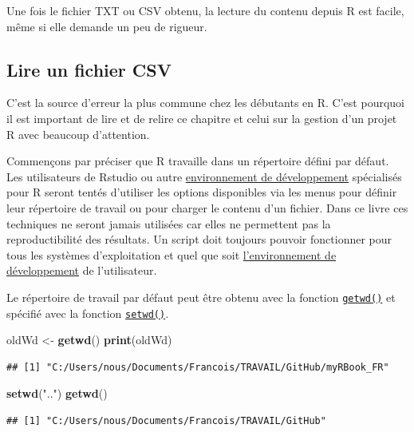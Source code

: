\documentclass[
]{book}
\newenvironment{Shaded}{\begin{snugshade}}{\end{snugshade}}
\newcommand{\KeywordTok}[1]{\textcolor[rgb]{0.13,0.29,0.53}{\textbf{#1}}}
\newcommand{\NormalTok}[1]{#1}
\newcommand{\StringTok}[1]{\textcolor[rgb]{0.31,0.60,0.02}{#1}}
\begin{document}
Une fois le fichier TXT ou CSV obtenu, la lecture du contenu depuis R est facile, même si elle demande un peu de rigueur.

\hypertarget{l016readCSV}{%
\subsection{Lire un fichier CSV}\label{l016readCSV}}

C'est la source d'erreur la plus commune chez les débutants en R. C'est pourquoi il est important de lire et de relire ce chapitre et celui sur la gestion d'un projet R avec beaucoup d'attention.

Commençons par préciser que R travaille dans un répertoire défini par défaut. Les utilisateurs de Rstudio ou autre \protect\hyperlink{IDE}{environnement de développement} spécialisés pour R seront tentés d'utiliser les options disponibles via les menus pour définir leur répertoire de travail ou pour charger le contenu d'un fichier. Dans ce livre ces techniques ne seront jamais utilisées car elles ne permettent pas la reproductibilité des résultats. Un script doit toujours pouvoir fonctionner pour tous les systèmes d'exploitation et quel que soit \protect\hyperlink{IDE}{l'environnement de développement} de l'utilisateur.

Le répertoire de travail par défaut peut être obtenu avec la fonction \protect\hyperlink{l015getwd}{\texttt{getwd()}} et spécifié avec la fonction \protect\hyperlink{l015setwd}{\texttt{setwd()}}.

\begin{Shaded}
\begin{Highlighting}[]
\NormalTok{oldWd <-}\StringTok{ }\KeywordTok{getwd}\NormalTok{()}
\KeywordTok{print}\NormalTok{(oldWd)}
\end{Highlighting}
\end{Shaded}

\begin{verbatim}
## [1] "C:/Users/nous/Documents/Francois/TRAVAIL/GitHub/myRBook_FR"
\end{verbatim}

\begin{Shaded}
\begin{Highlighting}[]
\KeywordTok{setwd}\NormalTok{(}\StringTok{".."}\NormalTok{)}
\KeywordTok{getwd}\NormalTok{()}
\end{Highlighting}
\end{Shaded}

\begin{verbatim}
## [1] "C:/Users/nous/Documents/Francois/TRAVAIL/GitHub"
\end{verbatim}
\end{document}
